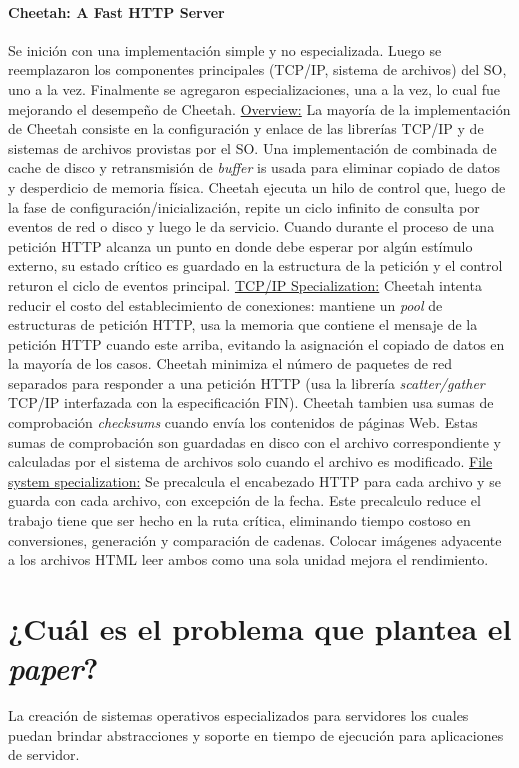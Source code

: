 \paragraph{\textnormal{\textbf{Cheetah: A Fast HTTP Server}}}
Se inición con una implementación simple y no especializada. Luego se reemplazaron los componentes principales (TCP/IP, sistema de archivos) del SO, uno a la vez. Finalmente se agregaron especializaciones, una a la vez, lo cual fue mejorando el desempeño de Cheetah. \underline{Overview:} La mayoría de la implementación de Cheetah consiste en la configuración y enlace de las librerías TCP/IP y de sistemas de archivos provistas por el SO. Una implementación de combinada de cache de disco y retransmisión de \textit{buffer} is usada para eliminar copiado de datos y desperdicio de memoria física. Cheetah ejecuta un hilo de control que, luego de la fase de configuración/inicialización, repite un ciclo infinito de consulta por eventos de red o disco y luego le da servicio. Cuando durante el proceso de una petición HTTP alcanza un punto en donde debe esperar por algún estímulo externo, su estado crítico es guardado en la estructura de la petición y el control returon el ciclo de eventos principal. \underline{TCP/IP Specialization:} Cheetah intenta reducir el costo del establecimiento de conexiones: mantiene un \textit{pool} de estructuras de petición HTTP, usa la memoria que contiene el mensaje de la petición HTTP cuando este arriba, evitando la asignación el copiado de datos en la mayoría de los casos. Cheetah minimiza el número de paquetes de red separados para responder a una petición HTTP (usa la librería \textit{scatter/gather} TCP/IP interfazada con la especificación FIN). Cheetah tambien usa sumas de comprobación \textit{checksums} cuando envía los contenidos de páginas Web. Estas sumas de comprobación son guardadas en disco con el archivo correspondiente y calculadas por el sistema de archivos solo cuando el archivo es modificado. \underline{File system specialization:} Se precalcula el encabezado HTTP para cada archivo y se guarda con cada archivo, con excepción de la fecha. Este precalculo reduce el trabajo tiene que ser hecho en la ruta crítica, eliminando tiempo costoso en conversiones, generación y comparación de cadenas. Colocar imágenes adyacente a los archivos HTML leer ambos como una sola unidad mejora el rendimiento.


\section{¿Cuál es el problema que plantea el \textit{paper}?}
La creación de sistemas operativos especializados para servidores los cuales puedan brindar abstracciones y soporte en tiempo de ejecución para aplicaciones de servidor. 

